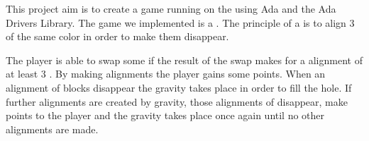 This project aim is to create a game running on the \stmdb using Ada and the Ada Drivers Library. The game we implemented is a \mtg.
The principle of a \mtg is to align 3 \sqs of the same color in order to make them disappear.

The player is able to swap some \sqs if the result of the swap makes for a alignment of at least 3 \sqs.
By making alignments the player gains some points. When an alignment of blocks disappear the gravity takes place in order to fill the hole.
If further alignments are created by gravity, those alignments of \sqs disappear, make points to the player and the gravity takes place once again until no other alignments are made.
